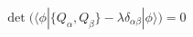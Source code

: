 \begin{equation}
\det \Big( \langle \phi| \{Q_\alpha, Q_\beta\} 
   - \lambda \delta_{\alpha\beta}|\phi\rangle \Big) = 0
\end{equation}

